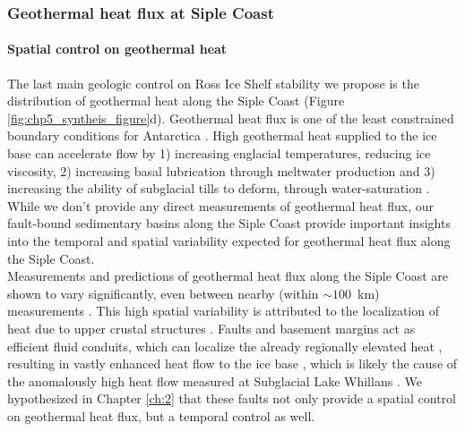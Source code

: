 

\subsubsection{Geothermal heat flux at Siple Coast}

\paragraph*{Spatial control on geothermal heat}

The last main geologic control on Ross Ice Shelf stability we propose is the distribution of geothermal heat along the Siple Coast (Figure \ref{fig:chp5_syntheis_figure}d). Geothermal heat flux is one of the least constrained boundary conditions for Antarctica \citep{larourice2012, pollardsensitivity2005, seroussiinfluence2017}. High geothermal heat supplied to the ice base can accelerate flow by 1) increasing englacial temperatures, reducing ice viscosity, 2) increasing basal lubrication through meltwater production and 3) increasing the ability of subglacial tills to deform, through water-saturation \citep{golledgebasal2014, pollardsensitivity2005}. While we don't provide any direct measurements of geothermal heat flux, our fault-bound sedimentary basins along the Siple Coast provide important insights into the temporal and spatial variability expected for geothermal heat flux along the Siple Coast. \\

Measurements and predictions of geothermal heat flux along the Siple Coast are shown to vary significantly, even between nearby (within $\sim100$~km) measurements \citep[Figure \ref{fig:chp5_syntheis_figure}d, ][]{begemanspatially2017, foxmauleheat2005}. This high spatial variability is attributed to the localization of heat due to upper crustal structures \citep{begemanspatially2017}. Faults and basement margins act as efficient fluid conduits, which can localize the already regionally elevated heat \citep[e.g.,][]{foxmauleheat2005, burton-johnsongeothermal2020}, resulting in vastly enhanced heat flow to the ice base \citep{goochpotential2016}, which is likely the cause of the anomalously high heat flow measured at Subglacial Lake Whillans \citep[285~mWm\textsuperscript{-2},][]{fisherhigh2015}. We hypothesized in Chapter \ref{ch:2} that these faults not only provide a spatial control on geothermal heat flux, but a temporal control as well. \\

